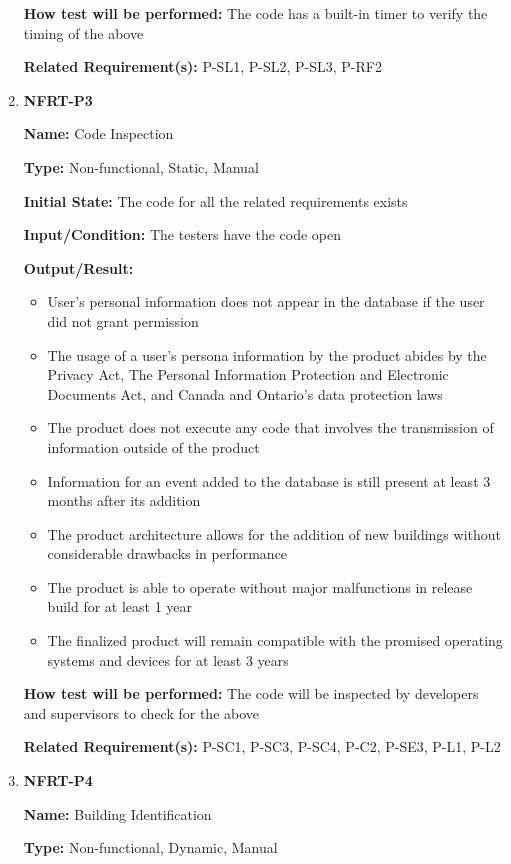 \documentclass[12pt, titlepage]{article}
\begin{document}
\begin{enumerate}
\textbf{How test will be performed:} The code has a built-in timer to verify the timing of the above

\textbf{Related Requirement(s):} P-SL1, P-SL2, P-SL3, P-RF2

\item{\textbf{NFRT-P3}}

\textbf{Name:} Code Inspection

\textbf{Type:} Non-functional, Static, Manual
					
\textbf{Initial State:} The code for all the related requirements exists

\textbf{Input/Condition:} The testers have the code open

\textbf{Output/Result:}
\begin{itemize}
  \item User's personal information does not appear in the database if the user did not grant permission
  \item The usage of a user's persona information by the product abides by the Privacy Act, The Personal Information Protection and Electronic Documents Act, and Canada and Ontario's data protection laws
  \item The product does not execute any code that involves the transmission of information outside of the product
  \item Information for an event added to the database is still present at least 3 months after its addition
  \item The product architecture allows for the addition of new buildings without considerable drawbacks in performance
  \item The product is able to operate without major malfunctions in release build for at least 1 year
  \item The finalized product will remain compatible with the promised operating systems and devices for at least 3 years
\end{itemize}

\textbf{How test will be performed:} The code will be inspected by developers and supervisors to check for the above

\textbf{Related Requirement(s):} P-SC1, P-SC3, P-SC4, P-C2, P-SE3, P-L1, P-L2

\item{\textbf{NFRT-P4}}

\textbf{Name:} Building Identification

\textbf{Type:} Non-functional, Dynamic, Manual
					

\end{enumerate}
\end{document}

